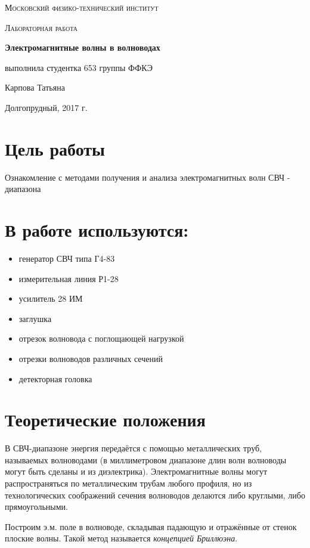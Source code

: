 \documentclass[a4paper]{article}
\begin{document}
\begin{titlepage}
	\centering
	\vspace{5cm}
	{\scshape\LARGE Московский физико-технический институт \par}
	\vspace{4cm}
	{\scshape\Large Лабораторная работа \par}
	\vspace{1cm}
	{\huge\bfseries Электромагнитные волны в волноводах \par}
	\vspace{1cm}
	\vfill
\begin{flushright}
	{\large выполнила студентка 653 группы ФФКЭ}\par
	\vspace{0.3cm}
	{\LARGE Карпова Татьяна}
\end{flushright}
	

	\vfill

	Долгопрудный, 2017 г.
\end{titlepage}

\section{Цель работы}
Ознакомление с методами получения и анализа электромагнитных волн СВЧ - диапазона

\section{В работе используются:}
\begin{itemize}
    \item генератор СВЧ типа Г4-83
    \item измерительная линия Р1-28
    \item усилитель 28 ИМ
    \item заглушка
    \item отрезок волновода с поглощающей нагрузкой
    \item отрезки волноводов различных сечений
    \item детекторная головка
\end{itemize}

\section{Теоретические положения}

В СВЧ-диапазоне энергия передаётся с помощью металлических труб,
называемых волноводами (в миллиметровом диапазоне длин волн волноводы могут быть сделаны и из диэлектрика). Электромагнитные волны могут распространяться по металлическим трубам любого профиля, но из технологических соображений сечения волноводов делаются либо
круглыми, либо прямоугольными. \par
Построим э.м. поле в волноводе, складывая падающую и отражённые от стенок плоские волны. Такой метод называется \textit{концепцией Бриллюэна}. \par
\end{document}
